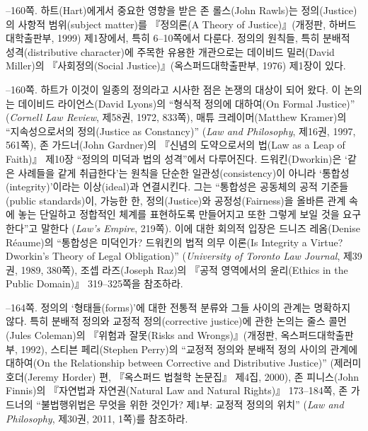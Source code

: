 {--160쪽.  하트(Hart)에게서 중요한 영향을 받은 존 롤스(John Rawls)는
정의(Justice)의 사항적 범위(subject matter)를 『정의론(A Theory of
Justice)』(개정판, 하버드대학출판부, 1999) 제1장에서, 특히 6--10쪽에서
다룬다. 정의의 원칙들, 특히 분배적 성격(distributive character)에 주목한
유용한 개관으로는 데이비드 밀러(David Miller)의 『사회정의(Social
Justice)』(옥스퍼드대학출판부, 1976) 제1장이 있다.

--160쪽.  하트가 이것이 일종의 정의라고 시사한 점은 논쟁의 대상이 되어
왔다. 이 논의는 데이비드 라이언스(David Lyons)의 “형식적 정의에
대하여(On Formal Justice)” (\emph{Cornell Law Review}, 제58권, 1972,
833쪽), 매튜 크레이머(Matthew Kramer)의 “지속성으로서의 정의(Justice as
Constancy)” (\emph{Law and Philosophy}, 제16권, 1997, 561쪽), 존
가드너(John Gardner)의 『신념의 도약으로서의 법(Law as a Leap of
Faith)』 제10장 “정의의 미덕과 법의 성격”에서 다루어진다.
드워킨(Dworkin)은 ‘같은 사례들을 같게 취급한다’는 원칙을 단순한
일관성(consistency)이 아니라 ‘통합성(integrity)’이라는 이상(ideal)과
연결시킨다. 그는 “통합성은 공동체의 공적 기준들(public standards)이,
가능한 한, 정의(Justice)와 공정성(Fairness)을 올바른 관계 속에 놓는
단일하고 정합적인 체계를 표현하도록 만들어지고 또한 그렇게 보일 것을
요구한다”고 말한다 (\emph{Law's Empire}, 219쪽). 이에 대한 회의적
입장은 드니즈 레옴(Denise Réaume)의 “통합성은 미덕인가? 드워킨의 법적
의무 이론(Is Integrity a Virtue? Dworkin's Theory of Legal Obligation)”
(\emph{University of Toronto Law Journal}, 제39권, 1989, 380쪽), 조셉
라즈(Joseph Raz)의 『공적 영역에서의 윤리(Ethics in the Public Domain)』
319--325쪽을 참조하라.

--164쪽.  정의의 ‘형태들(forms)’에 대한 전통적 분류와
그들 사이의 관계는 명확하지 않다. 특히 분배적 정의와 교정적
정의(corrective justice)에 관한 논의는 줄스 콜먼(Jules Coleman)의
『위험과 잘못(Risks and Wrongs)』(개정판, 옥스퍼드대학출판부, 1992),
스티븐 페리(Stephen Perry)의 “교정적 정의와 분배적 정의 사이의 관계에
대하여(On the Relationship between Corrective and Distributive
Justice)” (제러미 호더(Jeremy Horder) 편, 『옥스퍼드 법철학 논문집』
제4집, 2000), 존 피니스(John Finnis)의 『자연법과 자연권(Natural Law and
Natural Rights)』 173--184쪽, 존 가드너의 “불법행위법은 무엇을 위한
것인가? 제1부: 교정적 정의의 위치” (\emph{Law and Philosophy}, 제30권,
2011, 1쪽)를 참조하라.

}
